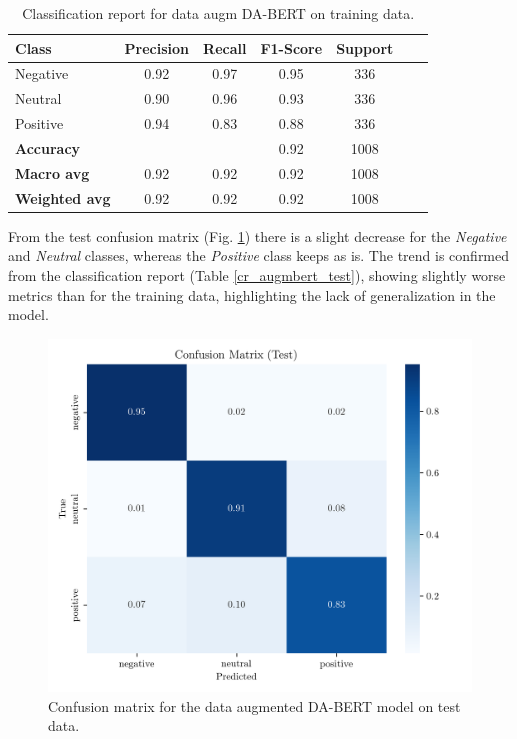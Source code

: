 \documentclass[conference]{IEEEtran}
\begin{document}
\begin{table}[H]
\centering
\caption{Classification report for data augm DA-BERT on training data.}
\label{cr_augmbert_train}
\begin{tabular}{lcccccc}
\toprule
\textbf{Class} & \textbf{Precision} & \textbf{Recall} & \textbf{F1-Score} & \textbf{Support} \\
\midrule
Negative & 0.92 & 0.97 & 0.95 & 336 \\
Neutral & 0.90 & 0.96 & 0.93 & 336 \\
Positive & 0.94 & 0.83 & 0.88 & 336 \\
\midrule
\textbf{Accuracy} &  &  & 0.92 & 1008 \\
\textbf{Macro avg} & 0.92 & 0.92 & 0.92 & 1008 \\
\textbf{Weighted avg} & 0.92 & 0.92 & 0.92 & 1008 \\
\bottomrule
\end{tabular}
\end{table}

From the test confusion matrix (Fig. \ref{fig:dataaugmented_bert_confusion_matrix_Test}) there is a slight decrease for the \textit{Negative} and \textit{Neutral} classes, whereas the \textit{Positive} class keeps as is. The trend is confirmed from the classification report (Table \ref{cr_augmbert_test}), showing slightly worse metrics than for the training data, highlighting the lack of generalization in the model.

\begin{figure}[H]
    \centering
    \includegraphics[width=1\linewidth]{assets/dataaugmented_bert_confusion_matrix_Test.png}
    \caption{Confusion matrix for the data augmented DA-BERT model on test data.}
    \label{fig:dataaugmented_bert_confusion_matrix_Test}
\end{figure}
\end{document}
